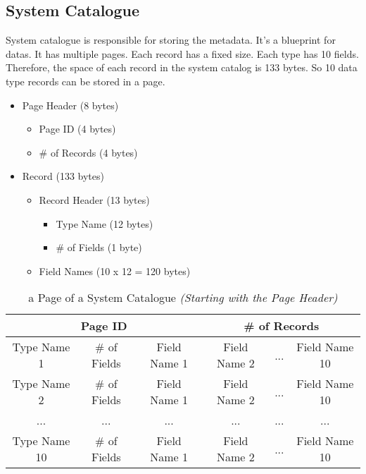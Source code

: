 \documentclass[12pt,a4paper]{article}
\begin{document}
    \subsection{System Catalogue}
        System catalogue is responsible for storing the metadata. It's a blueprint for datas. It has multiple pages. Each record has a fixed size. Each type has 10 fields. Therefore, the space of each record in the system catalog is 133 bytes. So 10 data type records can be stored in a page.

        \begin{itemize}
          \item Page Header (8 bytes)
            \begin{itemize}
                 \item Page ID (4 bytes)
                 \item \# of Records (4 bytes)
            \end{itemize}
          \item Record (133 bytes)
            \begin{itemize}
                 \item Record Header (13 bytes)
                    \begin{itemize}
                        \item Type Name (12 bytes)
                        \item \# of Fields (1 byte)
                    \end{itemize}
                 \item Field Names (10 x 12 = 120 bytes)
            \end{itemize}
        \end{itemize}

        \begin{table}[h!]
                \begin{center}
                    \begin{tabular}{ | c | c | c | c | c | c | }
                    \hline
                        \multicolumn{3}{||c|}{Page ID} &
                        \multicolumn{3}{|c||}{\# of Records} \\
                    \hline
                    \hline
                    Type Name 1 & \# of Fields & Field Name 1 & Field Name 2 & ... & Field Name 10 \\
                    \hline
                    Type Name 2 & \# of Fields & Field Name 1 & Field Name 2 & ... & Field Name 10 \\
                    \hline
                    ... & ... & ... & ... & ... & ... \\
                    \hline
                    Type Name 10 & \# of Fields & Field Name 1 & Field Name 2 & ... & Field Name 10 \\
                    \hline
                    \end{tabular}
                \end{center}
            \caption{a Page of a System Catalogue \emph{(Starting with the Page Header)}}
            \label{table:1}
        \end{table}
\end{document}
